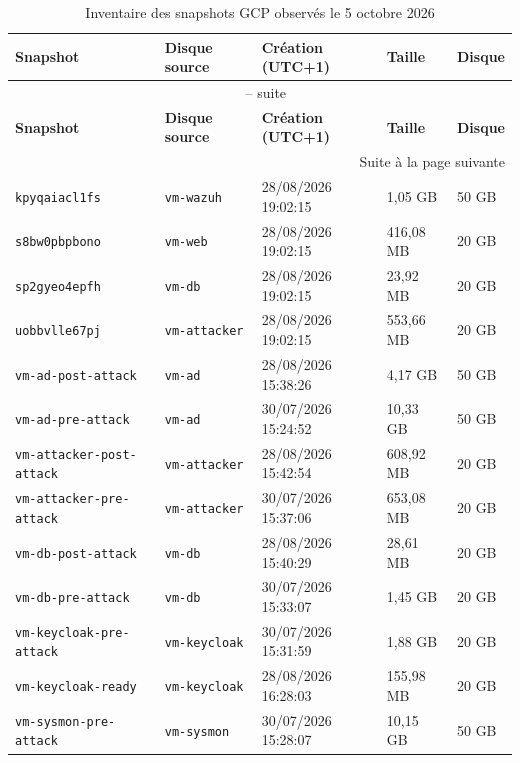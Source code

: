 \documentclass[a4paper,12pt]{report}
\begin{document}
\begin{longtable}{@{}p{4.4cm}p{2.4cm}p{3.4cm}p{1.8cm}p{1.5cm}@{}}
\caption{Inventaire des snapshots GCP observés le 5 octobre 2026}\label{tab:snapshots-gcp}\\
\toprule
\textbf{Snapshot} & \textbf{Disque source} & \textbf{Création (UTC+1)} & \textbf{Taille} & \textbf{Disque} \\
\midrule
\endfirsthead
\multicolumn{5}{c}{\tablename\ \thetable{} -- suite}\\
\toprule
\textbf{Snapshot} & \textbf{Disque source} & \textbf{Création (UTC+1)} & \textbf{Taille} & \textbf{Disque} \\
\midrule
\endhead
\midrule
\multicolumn{5}{r}{Suite à la page suivante}\\
\endfoot
\bottomrule
\endlastfoot
\texttt{kpyqaiacl1fs} & \texttt{vm-wazuh} & 28/08/2026 19:02:15 & 1,05 GB & 50 GB \\
\texttt{s8bw0pbpbono} & \texttt{vm-web} & 28/08/2026 19:02:15 & 416,08 MB & 20 GB \\
\texttt{sp2gyeo4epfh} & \texttt{vm-db} & 28/08/2026 19:02:15 & 23,92 MB & 20 GB \\
\texttt{uobbvlle67pj} & \texttt{vm-attacker} & 28/08/2026 19:02:15 & 553,66 MB & 20 GB \\
\texttt{vm-ad-post-attack} & \texttt{vm-ad} & 28/08/2026 15:38:26 & 4,17 GB & 50 GB \\
\texttt{vm-ad-pre-attack} & \texttt{vm-ad} & 30/07/2026 15:24:52 & 10,33 GB & 50 GB \\
\texttt{vm-attacker-}\newline\texttt{post-attack} & \texttt{vm-attacker} & 28/08/2026 15:42:54 & 608,92 MB & 20 GB \\
\texttt{vm-attacker-}\newline\texttt{pre-attack} & \texttt{vm-attacker} & 30/07/2026 15:37:06 & 653,08 MB & 20 GB \\
\texttt{vm-db-post-attack} & \texttt{vm-db} & 28/08/2026 15:40:29 & 28,61 MB & 20 GB \\
\texttt{vm-db-pre-attack} & \texttt{vm-db} & 30/07/2026 15:33:07 & 1,45 GB & 20 GB \\
\texttt{vm-keycloak-}\newline\texttt{pre-attack} & \texttt{vm-keycloak} & 30/07/2026 15:31:59 & 1,88 GB & 20 GB \\
\texttt{vm-keycloak-ready} & \texttt{vm-keycloak} & 28/08/2026 16:28:03 & 155,98 MB & 20 GB \\
\texttt{vm-sysmon-pre-attack} & \texttt{vm-sysmon} & 30/07/2026 15:28:07 & 10,15 GB & 50 GB \\

\end{longtable}
\end{document}

